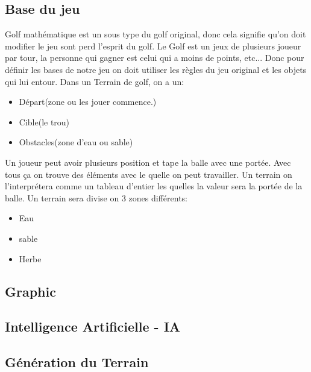 \documentclass{article}
\begin{document}
\subsection{Base du jeu}
Golf mathématique est un sous type du golf original, donc cela signifie qu'on doit modifier le jeu sont perd l'esprit du golf.
Le Golf est un jeux de plusieurs joueur par tour, la personne qui gagner est celui qui a moins de points, etc...
Donc pour définir les bases de notre jeu on doit utiliser les règles du jeu original et les objets qui lui entour.
Dans un Terrain de golf, on a un:
\begin{itemize}
\item Départ(zone ou les jouer commence.)
\item Cible(le trou)
\item Obstacles(zone d'eau ou sable)
\end{itemize}
Un joueur peut avoir plusieurs position et tape la balle avec une portée.
Avec tous ça on trouve des éléments avec le quelle on peut travailler.
Un terrain on l’interprétera comme un tableau d'entier les quelles la valeur sera la portée de la balle.
Un terrain sera divise on 3 zones différents:
\begin{itemize}
\item Eau
\item sable
\item Herbe
\end{itemize}
\subsection{Graphic}
\subsection{Intelligence Artificielle - IA}
\newpage
\subsection{Génération du Terrain}
\end{document}
